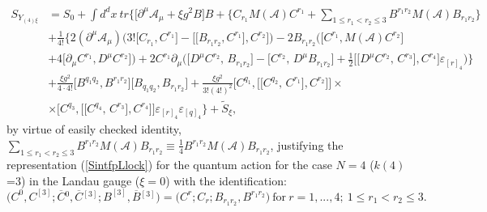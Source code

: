 \documentclass[10pt]{article}
\begin{document}
\begin{align}
  S_{Y_{(4)\xi}} & = S_0 +  \int d^{d}x\ tr \Bigg\{  \Big[    \partial^{\mu}\mathcal{A}_{\mu
}  + {\xi g^2} B\Big]  B +  \Big\{  C_{r_1}M(\mathcal{A})  C^{r_1} + \sum_{1\leq r_1<r_2 \leq 3} B^{r_1r_2}M(\mathcal{A})  B_{r_1r_2} \Big\} \nonumber \\
 \phantom{S_{Y_{(4)\xi}}} &
 + \frac{1}{4!}\Big\{2(\partial^\mu\mathcal{ A}_{\mu })  \Big(3!\big[C_{r_1}, C^{r_1}\big]  - \big[\big[B_{r_1r_2}, C^{r_1}\big], C^{r_2}\big]\Big) -  2B_{r_1r_2}\Big(\big[ C^{r_1},  M(\mathcal{A})C^{r_2}\big]\nonumber \\
\phantom{S_{Y_{(4)\xi}}}&    +4\big[ \partial_\mu C^{r_1},  D^\mu C^{r_2}\big]\Big)+
 2C^{r_1}\partial_\mu \Big( \big[D^\mu C^{r_2},\,    B_{r_1r_2}\big] -\big[C^{r_2},\, D^\mu B_{r_1r_2}   \big] + \frac{1}{2}\big[\big[D^\mu C^{r_2},\, C^{r_3}\big],  C^{r_4}\big]\varepsilon_{[r]_4}\Big)\Big\}
 \nonumber \\
\phantom{S_{Y_{(4)\xi}}} &+\frac{{\xi g^2}}{4\cdot4!}\big[B^{q_1q_2}, B^{r_1r_2}\big]
\big[B_{q_1q_2}, B_{r_1r_2}\big]   + \frac{{\xi g^2}}{3!(4!)^2}\big[C^{q_1},\big[\big[C^{q_2},\,C^{r_1}\big] , C^{r_2}\big]\big]\times \nonumber\\
 \phantom{S_{Y_{(4)\xi}}} &    \times \big[C^{q_3},\big[\big[C^{q_4},\,C^{r_3}\big] , C^{r_4}\big]\big]\varepsilon_{[r]_4}\varepsilon_{[q]_4} \Bigg\}+\widetilde{S}_\xi,
\label{qexi4appgen}
\end{align}
   by virtue of easily checked   identity, $\sum_{1\leq r_1<r_2 \leq 3} B^{r_1r_2}M(\mathcal{A})  B_{r_1r_2} \equiv \frac{1}{4} B^{r_1r_2}M(\mathcal{A})  B_{r_1r_2}$,  justifying the representation (\ref{SintfpLlock}) for the quantum action for the case  $N=4$ ($k(4)$=3) in the Landau gauge ($\xi=0$) with the identification:
   \begin{equation}\label{identifgh4}
   \big(C^0, C^{[3]}; \overline{C}{}^0 , \overline{C}{}^{[3]};  B^{[3]}, \overline{B}{}^{[3]}\big) =  \big(  C^{r};  {C}_{r} ;  {B}_{r_1r_2}, {B}^{r_1r_2}\big) \ \mathrm{for} \   r=1,...,4; \ 1\leq r_1<r_2 \leq 3.
 \end{equation}
\end{document}
